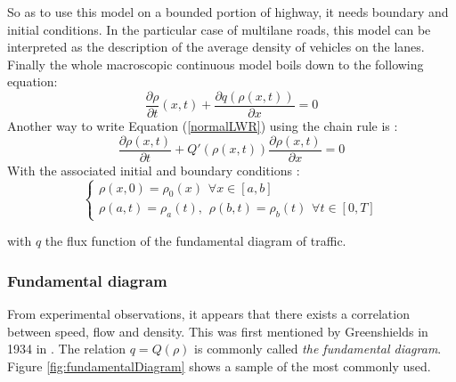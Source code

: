 \documentclass[letterpaper,10pt]{article}
\begin{document}
\bigskip
So as to use this model on a bounded portion of highway, it needs boundary and initial conditions. In the particular case of multilane roads, this model can be interpreted as the description of the average density of vehicles on the lanes. Finally the whole macroscopic continuous model boils down to the following equation:
\begin{equation} \label{normalLWR}
	\frac{\partial \rho}{\partial t}(x,t) + \frac{\partial q(\rho (x,t))}{\partial x} = 0 
\end{equation}
Another way to write Equation (\ref{normalLWR}) using the chain rule is :
\begin{equation} \label{eq:LWRmodel3}
\frac{\partial \rho(x,t)}{\partial t} + Q'(\rho(x,t))\frac{\partial \rho(x,t)}{\partial x} = 0
\end{equation}
With the associated initial and boundary conditions :
\begin{equation}
\left\{\begin{array}{lcl}
	\rho(x,0) = \rho_0(x) \hspace{5pt}\forall x \in [a,b]\\
	\rho(a,t) = \rho_a(t), \hspace{5pt}  \rho(b,t) = \rho_b(t) \hspace{5pt}\forall t \in [0,T]
\end{array}
\right.
\end{equation}

with $q$ the flux function of the fundamental diagram of traffic.

\subsubsection{Fundamental diagram}\label{FD}
From experimental observations, it appears that there exists a correlation between speed, flow and density. This was first mentioned by Greenshields in 1934 in \cite{Greenshields1934}. The relation $q = Q(\rho)$ is commonly called \textit{the fundamental diagram}. Figure \ref{fig:fundamentalDiagram} shows a sample of the most commonly used.
\end{document}
